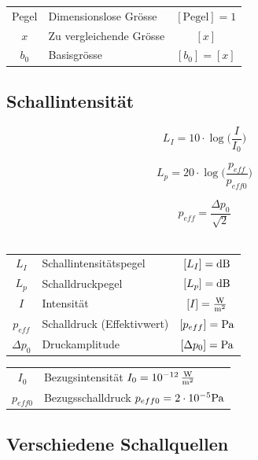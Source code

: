 \renewcommand{\arraystretch}{1.3}
\begin{tabular}{clc}
Pegel & Dimensionslose Grösse & $[\text{Pegel}] =  1$ \\
$x$ & Zu vergleichende Grösse & $[x]$ \\
$b_0$ & Basisgrösse & $[b_0] = [x]$ \\
\end{tabular}
\renewcommand{\arraystretch}{1}

\raggedright



\subsection{Schallintensität}

\begin{minipage}{0.48\linewidth}
$$ \boxed{ L_I = 10 \cdot \log \Big( \frac{I}{I_0} \Big) } $$ 
\end{minipage}
\hfill
\begin{minipage}{0.48\linewidth}
$$ \boxed{ L_p = 20 \cdot \log \Big( \frac{p_{eff}}{p_{eff0}} \Big) } $$ 
\end{minipage}

$$ \boxed{ p_{eff} = \frac{\Delta p_0}{\sqrt{2}} } $$ \\

\renewcommand{\arraystretch}{1.3}
\begin{tabular}{clc}
$L_I$ & Schallintensitätspegel & $[L_I] = \mathrm{dB}$ \\
$L_p$ & Schalldruckpegel & $[L_p] = \mathrm{dB}$ \\
$I$ & Intensität & $[I] = \frac{\mathrm{W}}{\mathrm{m}^2}$\\
$p_{eff}$ & Schalldruck (Effektivwert) & $[p_{eff}] = \mathrm{Pa}$ \\
$\Delta p_0$ & Druckamplitude & $[\Delta p_0] = \mathrm{Pa}$ 
\end{tabular}


\begin{tabular}{cl}
$I_0$ & Bezugsintensität $I_0 = 10^{-12} \, \frac{\mathrm{W}}{\mathrm{m}^2}$\\
$p_{eff0}$ & Bezugsschalldruck $p_{eff0} = 2 \cdot 10^{-5} \mathrm{Pa}$ \\
\end{tabular}
\renewcommand{\arraystretch}{1}


\subsection{Verschiedene Schallquellen}

